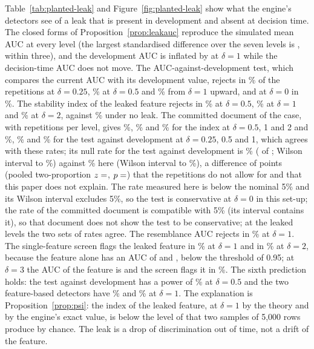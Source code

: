 

Table~\ref{tab:planted-leak} and Figure~\ref{fig:planted-leak} show what the engine's detectors see of a leak that is present in development and absent at decision time. The closed forms of Proposition~\ref{prop:leakauc} reproduce the simulated mean AUC at every level (the largest standardised difference over the seven levels is , within three), and the development AUC is inflated by  at $\delta=1$ while the decision-time AUC does not move. The AUC-against-development test, which compares the current AUC with its development value, rejects in \% of the repetitions at $\delta=0.25$, \% at $\delta=0.5$ and \% from $\delta=1$ upward, and at $\delta=0$ in \%. The stability index of the leaked feature rejects in \% at $\delta=0.5$, \% at $\delta=1$ and \% at $\delta=2$, against \% under no leak. The committed document of the case, with  repetitions per level, gives \%, \% and \% for the index at $\delta=0.5$, 1 and 2 and \%, \% and \% for the test against development at $\delta=0.25$, 0.5 and 1, which agrees with these rates; its null rate for the test against development is \% ( of ; Wilson interval  to \%) against \% here (Wilson interval  to \%), a difference of  points (pooled two-proportion $z=\nv{c22.null.z}$, $p=\nv{c22.null.p}$) that the repetitions do not allow for and that this paper does not explain. The rate measured here is below the nominal 5\% and its Wilson interval excludes 5\%, so the test is conservative at $\delta=0$ in this set-up; the rate of the committed document is compatible with 5\% (its interval contains it), so that document does not show the test to be conservative; at the leaked levels the two sets of rates agree. The resemblance AUC rejects in \% at $\delta=1$. The single-feature screen flags the leaked feature in \% at $\delta=1$ and in \% at $\delta=2$, because the feature alone has an AUC of  and , below the threshold of 0.95; at $\delta=3$ the AUC of the feature is  and the screen flags it in \%. The sixth prediction holds: the test against development has a power of \% at $\delta=0.5$ and the two feature-based detectors have \% and \% at $\delta=1$. The explanation is Proposition~\ref{prop:psi}: the index of the leaked feature,  at $\delta=1$ by the theory and  by the engine's exact value, is below the level of  that two samples of 5,000 rows produce by chance. The leak is a drop of discrimination out of time, not a drift of the feature.

